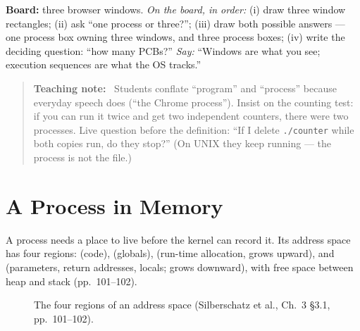 \documentclass[11pt]{article}
\newenvironment{teachingaside}{\begin{quote}\small\color{primary-gold}\textbf{Teaching note:}\ }{\end{quote}}
\begin{document}
\textbf{Board:} three browser windows. \emph{On the board, in order:} (i) draw three window rectangles; (ii) ask ``one process or three?''; (iii) draw both possible answers --- one process box owning three windows, and three process boxes; (iv) write the deciding question: ``how many PCBs?'' \emph{Say:} ``Windows are what you see; execution sequences are what the OS tracks.''

\begin{teachingaside}
Students conflate ``program'' and ``process'' because everyday speech does (``the Chrome process''). Insist on the counting test: if you can run it twice and get two independent counters, there were two processes. Live question before the definition: ``If I delete \texttt{./counter} while both copies run, do they stop?'' (On UNIX they keep running --- the process is not the file.)
\end{teachingaside}

\section{A Process in Memory}

A process needs a place to live before the kernel can record it. Its address space has four regions:  (code),  (globals),  (run-time allocation, grows upward), and  (parameters, return addresses, locals; grows downward), with free space between heap and stack (pp.~101--102).

\begin{figure}[h]
\centering
{}
\caption{The four regions of an address space (Silberschatz et al., Ch.~3 \S3.1, pp.~101--102).}
\end{figure}
\end{document}
